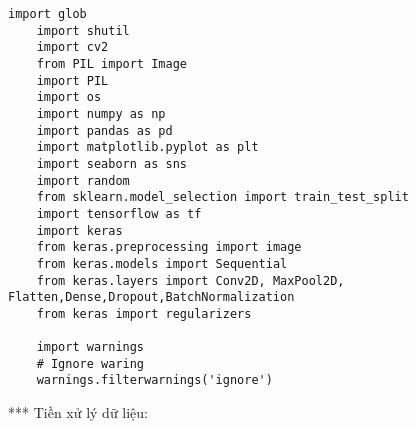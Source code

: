 \begin{lstlisting}[style=codePython]
  	import glob
  	import shutil
  	import cv2 
  	from PIL import Image
  	import PIL
  	import os
  	import numpy as np
  	import pandas as pd
  	import matplotlib.pyplot as plt
  	import seaborn as sns
  	import random 
  	from sklearn.model_selection import train_test_split
  	import tensorflow as tf
  	import keras
  	from keras.preprocessing import image
  	from keras.models import Sequential
  	from keras.layers import Conv2D, MaxPool2D, Flatten,Dense,Dropout,BatchNormalization
  	from keras import regularizers

  	import warnings
  	# Ignore waring
  	warnings.filterwarnings('ignore')  	
\end{lstlisting}

*** Tiền xử lý dữ liệu: 

